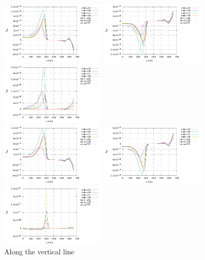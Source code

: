 \begin{center}
\includegraphics[width=5cm]{python_codes/fieldstone_26/results/case2b/vertical_exx.pdf}
\includegraphics[width=5cm]{python_codes/fieldstone_26/results/case2b/vertical_eyy.pdf}
\includegraphics[width=5cm]{python_codes/fieldstone_26/results/case2b/vertical_exy.pdf}\\
\includegraphics[width=5cm]{python_codes/fieldstone_26/results/case2b/vertical_exxn.pdf}
\includegraphics[width=5cm]{python_codes/fieldstone_26/results/case2b/vertical_eyyn.pdf}
\includegraphics[width=5cm]{python_codes/fieldstone_26/results/case2b/vertical_exyn.pdf}\\
{\captionfont Along the vertical line}
\end{center}


